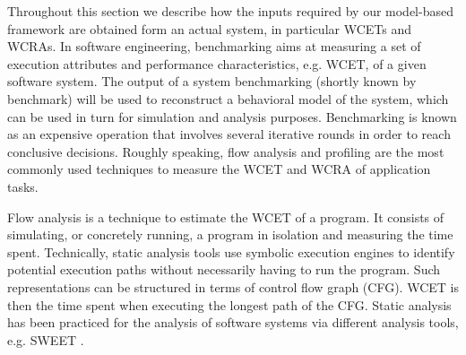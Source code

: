 \label{sec:methodology}
Throughout this section we describe how the inputs required by our model-based framework are obtained form an actual system, in particular WCETs and WCRAs. In software engineering, benchmarking \cite{Benchmarking} aims at measuring a set of execution attributes and performance characteristics, e.g. WCET, of a given software system. %
The output of a system benchmarking (shortly known by benchmark) will be used to reconstruct a behavioral model of the system,  which can be used in turn for simulation and analysis purposes. Benchmarking is known as an expensive operation that involves several iterative rounds in order to reach conclusive decisions. %
Roughly speaking, flow analysis and profiling are the most commonly used techniques to measure the WCET and WCRA of application tasks.  

Flow analysis \cite{Tan2009,Chatto2012} is a technique to estimate the WCET of a program. It consists of simulating, or concretely running, a program in isolation and measuring the time spent. Technically, static analysis tools use symbolic execution engines to identify potential execution paths without necessarily having to run the program. Such representations can be structured in terms of control flow graph (CFG). %
WCET is then the time spent when executing the longest path of the CFG. Static analysis has been practiced for the analysis of software systems via different analysis tools, e.g. {SWEET} \cite{Tan2009}. 


